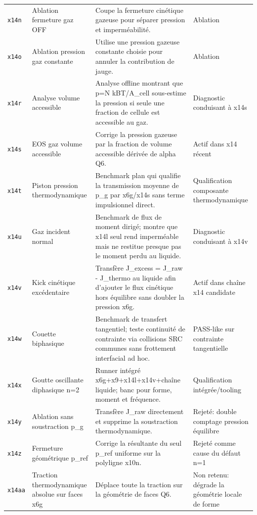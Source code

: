 \documentclass[a4paper,9pt]{article}
\begin{document}
\begin{landscape}
\begin{longtable}{L{2.35cm} L{5.3cm} L{13.25cm} L{4.75cm}}
\texttt{x14n} & Ablation fermeture gaz OFF & Coupe la fermeture cinétique gazeuse pour séparer pression et imperméabilité. & Ablation \\
\texttt{x14o} & Ablation pression gaz constante & Utilise une pression gazeuse constante choisie pour annuler la contribution de jauge. & Ablation \\
\texttt{x14r} & Analyse volume accessible & Analyse offline montrant que p=N kBT/A\_cell sous-estime la pression si seule une fraction de cellule est accessible au gaz. & Diagnostic conduisant à x14s \\
\texttt{x14s} & EOS gaz volume accessible & Corrige la pression gazeuse par la fraction de volume accessible dérivée de alpha Q6. & Actif dans x14 récent \\
\texttt{x14t} & Piston pression thermodynamique & Benchmark plan qui qualifie la transmission moyenne de p\_g par x6g/x14s sans terme impulsionnel direct. & Qualification composante thermodynamique \\
\texttt{x14u} & Gaz incident normal & Benchmark de flux de moment dirigé; montre que x14l seul rend imperméable mais ne restitue presque pas le moment perdu au liquide. & Diagnostic conduisant à x14v \\
\texttt{x14v} & Kick cinétique excédentaire & Transfère J\_excess = J\_raw - J\_thermo au liquide afin d'ajouter le flux cinétique hors équilibre sans doubler la pression x6g. & Actif dans chaîne x14 candidate \\
\texttt{x14w} & Couette biphasique & Benchmark de transfert tangentiel; teste continuité de contrainte via collisions SRC communes sans frottement interfacial ad hoc. & PASS-like sur contrainte tangentielle \\
\texttt{x14x} & Goutte oscillante diphasique n=2 & Runner intégré x6g+x9+x14l+x14v+chaîne liquide; banc pour forme, moment et fréquence. & Qualification intégrée/tooling \\
\texttt{x14y} & Ablation sans soustraction p\_g & Transfère J\_raw directement et supprime la soustraction thermodynamique. & Rejeté: double comptage pression équilibre \\
\texttt{x14z} & Fermeture géométrique p\_ref & Corrige la résultante du seul p\_ref uniforme sur la polyligne x10n. & Rejeté comme cause du défaut n=1 \\
\texttt{x14aa} & Traction thermodynamique absolue sur faces x6g & Déplace toute la traction sur la géométrie de faces Q6. & Non retenu: dégrade la géométrie locale de forme \\

\end{longtable}
\end{landscape}
\end{document}
